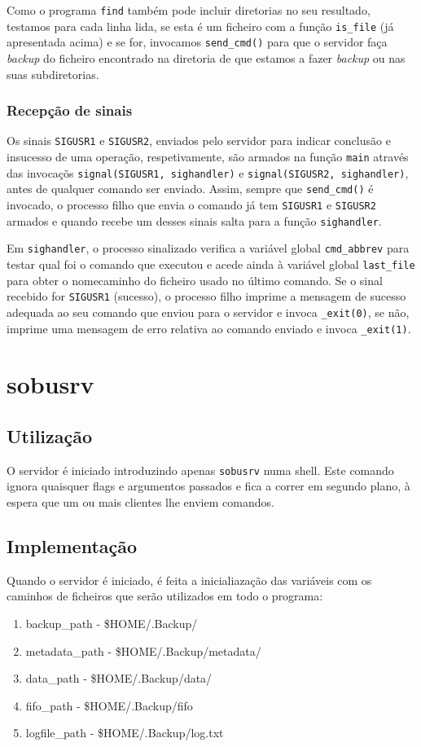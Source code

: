 \documentclass[a4paper,12pt,titlepage,portuguese]{article}
\begin{document}
Como o programa \texttt{find} também pode incluir diretorias no seu resultado, testamos para cada linha lida, se esta é um ficheiro com a função \texttt{is\_file} (já apresentada acima) e se for, invocamos \texttt{send\_cmd()} para que o servidor faça \emph{backup} do ficheiro encontrado na diretoria de que estamos a fazer \emph{backup} ou nas suas subdiretorias. 

\subsubsection{Recepção de sinais}

Os sinais \texttt{SIGUSR1} e \texttt{SIGUSR2}, enviados pelo servidor para indicar conclusão e insucesso de uma operação, respetivamente, são armados na função \texttt{main} através das invocaçõs \texttt{signal(SIGUSR1, sighandler)} e
\texttt{signal(SIGUSR2, sighandler)}, antes de qualquer comando ser enviado. Assim, sempre que \texttt{send\_cmd()} é invocado, o processo filho que envia o comando já tem \texttt{SIGUSR1} e \texttt{SIGUSR2} armados e quando recebe um desses sinais salta para a função \texttt{sighandler}. 

Em \texttt{sighandler}, o processo sinalizado verifica a variável global \texttt{cmd\_abbrev} para testar qual foi o comando que executou e acede ainda à variável global \texttt{last\_file} para obter o nome\/caminho do ficheiro usado no último comando. Se o sinal recebido for \texttt{SIGUSR1} (sucesso), o processo filho imprime a mensagem de sucesso adequada ao seu comando que enviou para o servidor e invoca \texttt{\_exit(0)}, se não, imprime uma mensagem de erro relativa ao comando enviado e invoca \texttt{\_exit(1)}.

\section{sobusrv}

\subsection{Utilização}

O servidor é iniciado introduzindo apenas \texttt{sobusrv} numa shell. Este comando ignora quaisquer flags e argumentos passados e fica a correr em segundo plano, à espera que um ou mais clientes lhe enviem comandos.
\subsection{Implementação}
Quando o servidor é iniciado, é feita a inicialiazação das variáveis com os caminhos de ficheiros que serão utilizados em todo o programa:
	\begin{enumerate}
		\item backup\_path - \$HOME/.Backup/
		\item metadata\_path -  \$HOME/.Backup/metadata/
		\item data\_path - \$HOME/.Backup/data/   
		\item fifo\_path - \$HOME/.Backup/fifo
		\item logfile\_path - \$HOME/.Backup/log.txt
	\end{enumerate}
	
\end{document}
